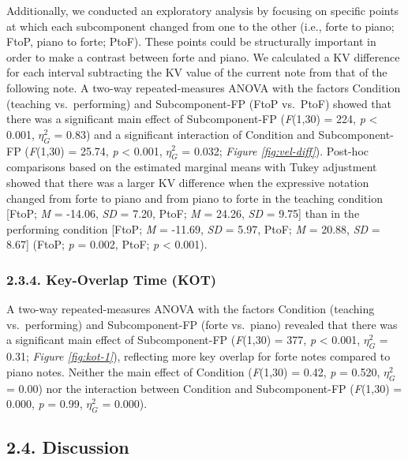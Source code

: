 \documentclass[
  english,
  man,floatsintext]{apa6}
\begin{document}
Additionally, we conducted an exploratory analysis by focusing on specific points at which each subcomponent changed from one to the other (i.e., forte to piano; FtoP, piano to forte; PtoF). These points could be structurally important in order to make a contrast between forte and piano. We calculated a KV difference for each interval subtracting the KV value of the current note from that of the following note. A two-way repeated-measures ANOVA with the factors Condition (teaching vs.~performing) and Subcomponent-FP (FtoP vs.~PtoF) showed that there was a significant main effect of Subcomponent-FP (\emph{F}(1,30) = 224, \emph{p} \textless{} 0.001, \(\eta_G^2\) = 0.83) and a significant interaction of Condition and Subcomponent-FP (\emph{F}(1,30) = 25.74, \emph{p} \textless{} 0.001, \(\eta_G^2\) = 0.032; \emph{Figure \ref{fig:vel-diff}}). Post-hoc comparisons based on the estimated marginal means with Tukey adjustment showed that there was a larger KV difference when the expressive notation changed from forte to piano and from piano to forte in the teaching condition {[}FtoP; \emph{M} = -14.06, \emph{SD} = 7.20, PtoF; \emph{M} = 24.26, \emph{SD} = 9.75{]} than in the performing condition {[}FtoP; \emph{M} = -11.69, \emph{SD} = 5.97, PtoF; \emph{M} = 20.88, \emph{SD} = 8.67{]} (FtoP; \emph{p} = 0.002, PtoF; \emph{p} \textless{} 0.001).

\hypertarget{key-overlap-time-kot-1}{%
\subsubsection{2.3.4. Key-Overlap Time (KOT)}\label{key-overlap-time-kot-1}}

A two-way repeated-measures ANOVA with the factors Condition (teaching vs.~performing) and Subcomponent-FP (forte vs.~piano) revealed that there was a significant main effect of Subcomponent-FP (\emph{F}(1,30) = 377, \emph{p} \textless{} 0.001, \(\eta_G^2\) = 0.31; \emph{Figure \ref{fig:kot-1}}), reflecting more key overlap for forte notes compared to piano notes. Neither the main effect of Condition (\emph{F}(1,30) = 0.42, \emph{p} = 0.520, \(\eta_G^2\) = 0.00) nor the interaction between Condition and Subcomponent-FP (\emph{F}(1,30) = 0.000, \emph{p} = 0.99, \(\eta_G^2\) = 0.000).

\hypertarget{discussion}{%
\subsection{2.4. Discussion}\label{discussion}}
\end{document}
